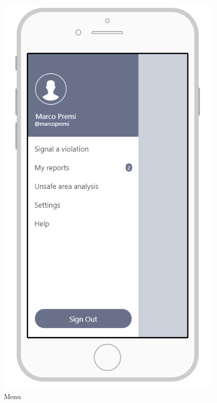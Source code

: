 \documentclass{article}
\begin{document}
\begin{figure}[H]
    \centering
    \includegraphics[scale=0.7]{Images/MenuAPP}
    \caption{Menu}
\end{figure}
\end{document}
